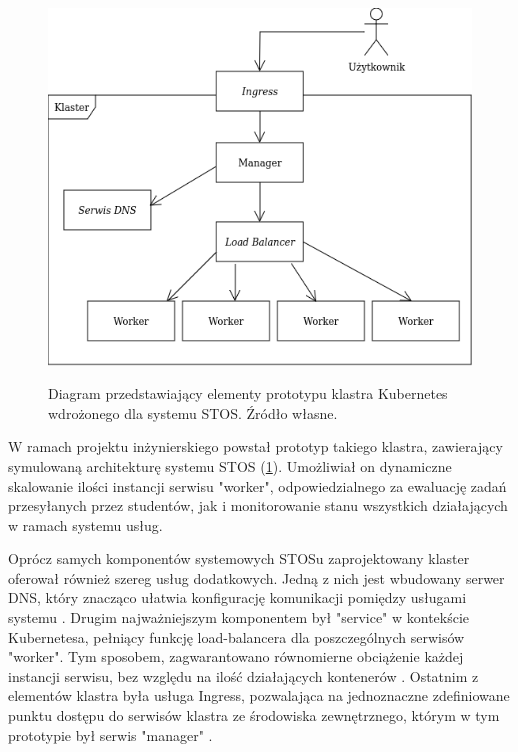 \begin{figure}[!h]
	\begin{center}
		\resizebox{0.7\textwidth}{!} {
			\includegraphics{img/4/k8s.png}
		}
		\caption[Diagram prototypu klastra Kubernetes]{Diagram przedstawiający elementy prototypu klastra Kubernetes wdrożonego dla systemu STOS. Źródło własne.}
		\label{diagramk8s}
	\end{center}
\end{figure}

W ramach projektu inżynierskiego powstał prototyp takiego klastra, zawierający symulowaną architekturę systemu STOS (\ref{diagramk8s}). Umożliwiał on dynamiczne skalowanie ilości instancji serwisu "worker", odpowiedzialnego za ewaluację zadań przesyłanych przez studentów, jak i monitorowanie stanu wszystkich działających w ramach systemu usług.

Oprócz samych komponentów systemowych STOSu zaprojektowany klaster oferował również szereg usług dodatkowych. Jedną z nich jest wbudowany serwer DNS, który znacząco ułatwia konfigurację komunikacji pomiędzy usługami systemu \cite{k8sDns}. Drugim najważniejszym komponentem był "service" w kontekście Kubernetesa, pełniący funkcję load-balancera dla poszczególnych serwisów "worker". Tym sposobem, zagwarantowano równomierne obciążenie każdej instancji serwisu, bez względu na ilość działających kontenerów \cite{k8sService}. Ostatnim z elementów klastra była usługa Ingress, pozwalająca na jednoznaczne zdefiniowane punktu dostępu do serwisów klastra ze środowiska zewnętrznego, którym w tym prototypie był serwis "manager" \cite{k8sIngress}.

